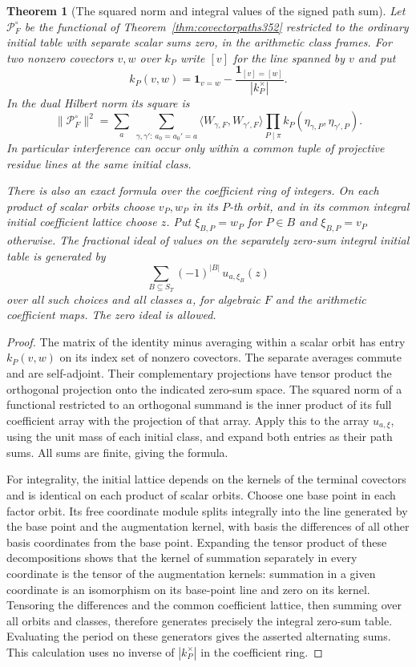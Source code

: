 \documentclass[a4paper,11pt]{article}
\newtheorem{theorem}[proposition]{Theorem}
\theoremstyle{definition}
\theoremstyle{remark}
\numberwithin{equation}{section}
\begin{document}
\begin{theorem}[The squared norm and integral values of the signed path sum]\leavevmode
\label{thm:pathnorm352}
Let \(\mathcal P_F^\circ\) be the functional of
Theorem~\ref{thm:covectorpaths352} restricted to the ordinary
initial table with separate scalar sums zero, in the arithmetic
class frames. For two nonzero covectors \(v,w\) over \(k_P\)
write \([v]\) for the line spanned by \(v\) and put
\[
 k_P(v,w)=\mathbf1_{v=w}
                -\frac{\mathbf1_{[v]=[w]}}{|k_P^\times|}.
\]
In the dual Hilbert norm its square is
\[
 \|\mathcal P_F^\circ\|^2
 =\sum_a\ \sum_{\gamma,\gamma':\,a_0=a_0'=a}
     \langle W_{\gamma,F},W_{\gamma',F}\rangle
          \prod_{P\mid\pi}k_P(\eta_{\gamma,P},\eta_{\gamma',P}).
\]
In particular interference can occur only within a common tuple
of projective residue lines at the same initial class.

There is also an exact formula over the coefficient ring of
integers. On each product of scalar orbits choose \(v_P,w_P\)
in its \(P\)-th orbit, and in its common integral initial
coefficient lattice choose \(z\). Put
\(\xi_{B,P}=w_P\) for \(P\in B\) and \(\xi_{B,P}=v_P\) otherwise.
The fractional ideal of values on the separately zero-sum
integral initial table is generated by
\[
        \sum_{B\subseteq S_T}(-1)^{|B|}\,u_{a,\xi_B}(z)
\]
over all such choices and all classes \(a\), for algebraic \(F\)
and the arithmetic coefficient maps. The zero ideal is allowed.
\end{theorem}
\begin{proof}
The matrix of the identity minus averaging within a scalar orbit
has entry \(k_P(v,w)\) on its index set of nonzero covectors.
The separate averages commute and are self-adjoint. Their
complementary projections have tensor product the orthogonal
projection onto the indicated zero-sum space. The squared norm
of a functional restricted to an orthogonal summand is the
inner product of its full coefficient array with the projection
of that array. Apply this to the array \(u_{a,\xi}\), using the
unit mass of each initial class, and expand both entries as their
path sums. All sums are finite, giving the formula.

For integrality, the initial lattice depends on the kernels of
the terminal covectors and is identical on each product of
scalar orbits. Choose one base point in each factor orbit.
Its free coordinate module splits integrally into the line
generated by the base point and the augmentation kernel,
with basis the differences of all other basis coordinates from
the base point. Expanding the tensor product of these
decompositions shows that the kernel of summation separately
in every coordinate is the tensor of the augmentation kernels:
summation in a given coordinate is an isomorphism on its
base-point line and zero on its kernel. Tensoring the differences
and the common coefficient lattice, then summing over all
orbits and classes, therefore generates precisely the integral
zero-sum table. Evaluating the period on these generators gives
the asserted alternating sums. This calculation uses no inverse
of \(|k_P^\times|\) in the coefficient ring.
\end{proof}
\end{document}
